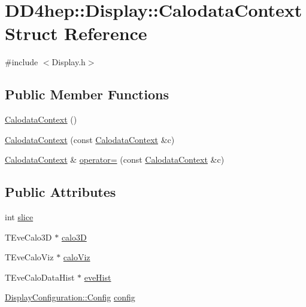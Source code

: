 \hypertarget{struct_d_d4hep_1_1_display_1_1_calodata_context}{
\section{DD4hep::Display::CalodataContext Struct Reference}
\label{struct_d_d4hep_1_1_display_1_1_calodata_context}
}


{\ttfamily \#include $<$Display.h$>$}\subsection*{Public Member Functions}
\begin{DoxyCompactItemize}
\item 
\hyperlink{struct_d_d4hep_1_1_display_1_1_calodata_context_ac1928f77613385e401e1b850ace44faa}{CalodataContext} ()
\item 
\hyperlink{struct_d_d4hep_1_1_display_1_1_calodata_context_ae66034e60c417d10aac4c068337e85a3}{CalodataContext} (const \hyperlink{struct_d_d4hep_1_1_display_1_1_calodata_context}{CalodataContext} \&c)
\item 
\hyperlink{struct_d_d4hep_1_1_display_1_1_calodata_context}{CalodataContext} \& \hyperlink{struct_d_d4hep_1_1_display_1_1_calodata_context_a968ee17376ea7bbab48975b221184f5e}{operator=} (const \hyperlink{struct_d_d4hep_1_1_display_1_1_calodata_context}{CalodataContext} \&c)
\end{DoxyCompactItemize}
\subsection*{Public Attributes}
\begin{DoxyCompactItemize}
\item 
int \hyperlink{struct_d_d4hep_1_1_display_1_1_calodata_context_a7a289d192f903d7fd62f5db2b6631eea}{slice}
\item 
TEveCalo3D $\ast$ \hyperlink{struct_d_d4hep_1_1_display_1_1_calodata_context_a61ac4175d05d258cc57210d2100c0663}{calo3D}
\item 
TEveCaloViz $\ast$ \hyperlink{struct_d_d4hep_1_1_display_1_1_calodata_context_af3730c667ed35846cfeb83eb21410cca}{caloViz}
\item 
TEveCaloDataHist $\ast$ \hyperlink{struct_d_d4hep_1_1_display_1_1_calodata_context_a55f5826e26bf9f967abeb22cd1f507d7}{eveHist}
\item 
\hyperlink{class_d_d4hep_1_1_display_configuration_1_1_config}{DisplayConfiguration::Config} \hyperlink{struct_d_d4hep_1_1_display_1_1_calodata_context_ad05be864371ffba5b06eadcb9be8511b}{config}
\end{DoxyCompactItemize}


